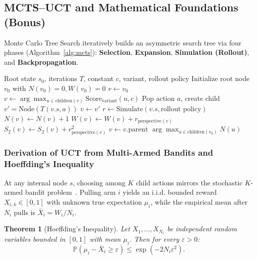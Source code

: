 \documentclass[conference]{IEEEtran}
\newtheorem{theorem}{Theorem}
\begin{document}
\subsection{MCTS--UCT and Mathematical Foundations (Bonus)}
Monte Carlo Tree Search iteratively builds an asymmetric search tree via four phases (Algorithm~\ref{alg:mcts}): \textbf{Selection}, \textbf{Expansion}, \textbf{Simulation (Rollout)}, and \textbf{Backpropagation}.

\begin{algorithm}[t]
\caption{Monte Carlo Tree Search with Pluggable UCT}
\label{alg:mcts}
\begin{algorithmic}[1]
\Require Root state $s_0$, iterations $T$, constant $c$, variant, rollout policy
\State Initialize root node $v_0$ with $N(v_0)=0, W(v_0)=0$
    \State $v \gets v_0$
     
        \State $v \gets \arg\max_{u \in \mathrm{children}(v)} \mathrm{Score}_{\text{variant}}(u, c)$
    \EndWhile
     
        \State Pop action $a$, create child $v' = \mathrm{Node}(T(v.s, a))$
        \State $v \gets v'$
    \EndIf
    \State $r \gets \mathrm{Simulate}(v.s, \text{rollout policy})$ 
     
        \State $N(v) \gets N(v) + 1$
        \State $W(v) \gets W(v) + r_{\text{perspective}(v)}$
        \State $S_2(v) \gets S_2(v) + r_{\text{perspective}(v)}^2$
        \State $v \gets v.\mathrm{parent}$
    \EndWhile
\EndFor
\State \Return $\arg\max_{u \in \mathrm{children}(v_0)} N(u)$ 
\end{algorithmic}
\end{algorithm}

\subsubsection{Derivation of UCT from Multi-Armed Bandits and Hoeffding's Inequality}
At any internal node $s$, choosing among $K$ child actions mirrors the stochastic $K$-armed bandit problem~\cite{auer2002}. Pulling arm $i$ yields an i.i.d. bounded reward $X_{i,k} \in [0, 1]$ with unknown true expectation $\mu_i$, while the empirical mean after $N_i$ pulls is $\bar{X}_i = W_i / N_i$.

\begin{theorem}[Hoeffding's Inequality]
Let $X_1, \dots, X_{N_i}$ be independent random variables bounded in $[0, 1]$ with mean $\mu_i$. Then for every $\varepsilon > 0$:
\begin{equation}
\mathbb{P}\!\left(\mu_i - \bar{X}_i \ge \varepsilon\right) \le \exp\!\left(-2 N_i \varepsilon^2\right).
\label{eq:hoeffding}
\end{equation}
\end{theorem}
\end{document}
